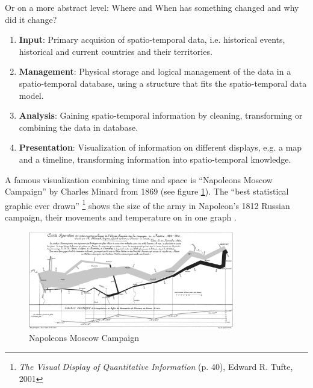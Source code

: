 Or on a more abstract level: Where and When has something changed and why did it change?

\begin{enumerate}
  \item \textbf{Input}: Primary acquision of spatio-temporal data, i.e. historical events, historical and current countries and their territories.
  \item \textbf{Management}: Physical storage and logical management of the data in a spatio-temporal database, using a structure that fits the spatio-temporal data model.
  \item \textbf{Analysis}: Gaining spatio-temporal information by cleaning, transforming or combining the data in database.
  \item \textbf{Presentation}: Visualization of information on different displays, e.g. a map and a timeline, transforming information into spatio-temporal knowledge.
\end{enumerate}


A famous visualization combining time and space is ``Napoleons Moscow Campaign'' by Charles Minard from 1869 (see figure \ref{fig:minard_napoleon}). The ``best statistical graphic ever drawn''
\footnote{
  \emph{The Visual Display of Quantitative Information} (p. 40),
  Edward R. Tufte,
  2001
}
shows the size of the army in Napoleon’s 1812 Russian campaign, their movements and temperature on in one graph
\cite[pp. 188-191]{knowles2008placing}.

\begin{figure}[ht]
  \centering
  \includegraphics[width=0.8\textwidth]{graphics/basics/napoleon_march_moscow.png}
  \caption{Napoleons Moscow Campaign \protect\footnotemark}
  \label{fig:minard_napoleon}
\end{figure}


